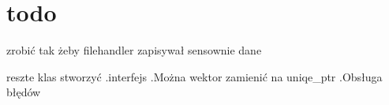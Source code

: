 \chapter{todo }
\hypertarget{md_todo}{}\label{md_todo}

\begin{DoxyEnumerate}
\item zrobić tak żeby filehandler zapisywał sensownie dane
\item reszte klas stworzyć \+[done].\+interfejs \+[done].\+Można wektor zamienić na uniqe\+\_\+ptr \+[done ig].\+Obsługa błędów 
\end{DoxyEnumerate}
